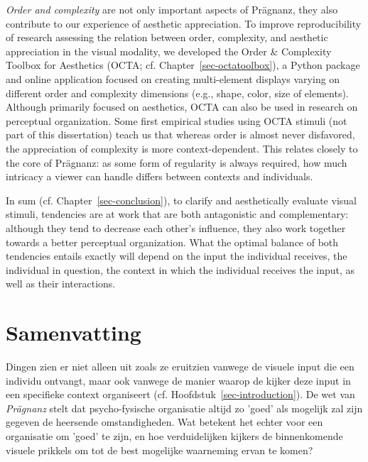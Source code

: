\textit{Order and complexity} are not only important aspects of Prägnanz, they also contribute to our experience of aesthetic appreciation. To improve reproducibility of research assessing the relation between order, complexity, and aesthetic appreciation in the visual modality, we developed the Order \& Complexity Toolbox for Aesthetics (OCTA; cf. Chapter~\ref{sec-octatoolbox}), a Python package and online application focused on creating multi-element displays varying on different order and complexity dimensions (e.g., shape, color, size of elements). Although primarily focused on aesthetics, OCTA can also be used in research on perceptual organization. Some first empirical studies using OCTA stimuli (not part of this dissertation) teach us that whereas order is almost never disfavored, the appreciation of complexity is more context-dependent. This relates closely to the core of Prägnanz: as some form of regularity is always required, how much intricacy a viewer can handle differs between contexts and individuals.

In sum (cf. Chapter~\ref{sec-conclusion}), to clarify and aesthetically evaluate visual stimuli, tendencies are at work that are both antagonistic and complementary: although they tend to decrease each other's influence, they also work together towards a better perceptual organization. What the optimal balance of both tendencies entails exactly will depend on the input the individual receives, the individual in question, the context in which the individual receives the input, as well as their interactions.

\clearpage\thispagestyle{empty}

\chapter*{Samenvatting}


Dingen zien er niet alleen uit zoals ze eruitzien vanwege de visuele input die een individu ontvangt, maar ook vanwege de manier waarop de kijker deze input in een specifieke context organiseert (cf. Hoofdstuk~\ref{sec-introduction}). De wet van \textit{Prägnanz} stelt dat psycho-fysische organisatie altijd zo 'goed' als mogelijk zal zijn gegeven de heersende omstandigheden. Wat betekent het echter voor een organisatie om 'goed' te zijn, en hoe verduidelijken kijkers de binnenkomende visuele prikkels om tot de best mogelijke waarneming ervan te komen?

